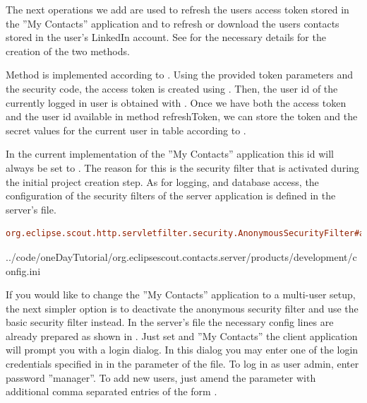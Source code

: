 \documentclass[a4paper,10pt,twoside]{book}
\begin{document}
The next operations we add are used to refresh the users access token stored in the ''My Contacts'' application and to refresh or download the users contacts stored in the user's LinkedIn account. 
See  for the necessary details for the creation of the two methods. 

Method  is implemented according to . 
Using the provided token parameters and the security code, the access token is created using . 
Then, the user id of the currently logged in user is obtained with . 
Once we have both the access token and the user id available in method {refreshToken}, we can store the token and the secret values for the current user in table  according to .

In the current implementation of the ''My Contacts'' application this id will always be set to . 
The reason for this is the  security filter that is activated during the initial project creation step. 
As for logging, and database access, the configuration of the security filters of the server application is defined in the server's  file.

\begin{lstlisting}[backgroundcolor=\color{white},language=ini]
org.eclipse.scout.http.servletfilter.security.AnonymousSecurityFilter#active=true
\end{lstlisting}


{../code/oneDayTutorial/org.eclipsescout.contacts.server/products/development/config.ini}

If you would like to change the ''My Contacts'' application to a multi-user setup, the next simpler option is to deactivate the anonymous security filter and use the basic security filter instead. 
In the server's  file the necessary config lines are already prepared as shown in . 
Just set  and ''My Contacts'' the client application will prompt you with a login dialog. 
In this dialog you may enter one of the login credentials specified in in the  parameter of the  file. 
To log in as user admin, enter password ''manager''. 
To add new users, just amend the  parameter with additional comma separated entries of the form .
\end{document}
